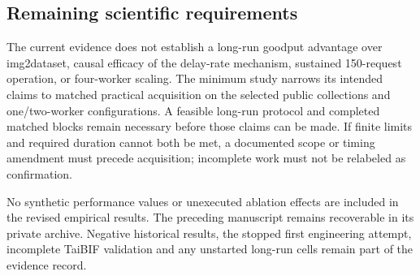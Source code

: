 \documentclass[10pt]{article}
\begin{document}
\subsection{Remaining scientific requirements}
The current evidence does not establish a long-run goodput advantage over img2dataset, causal efficacy of the delay-rate mechanism, sustained 150-request operation, or four-worker scaling. The minimum study narrows its intended claims to matched practical acquisition on the selected public collections and one/two-worker configurations. A feasible long-run protocol and completed matched blocks remain necessary before those claims can be made. If finite limits and required duration cannot both be met, a documented scope or timing amendment must precede acquisition; incomplete work must not be relabeled as confirmation.

No synthetic performance values or unexecuted ablation effects are included in the revised empirical results. The preceding manuscript remains recoverable in its private archive. Negative historical results, the stopped first engineering attempt, incomplete TaiBIF validation and any unstarted long-run cells remain part of the evidence record.
\end{document}
